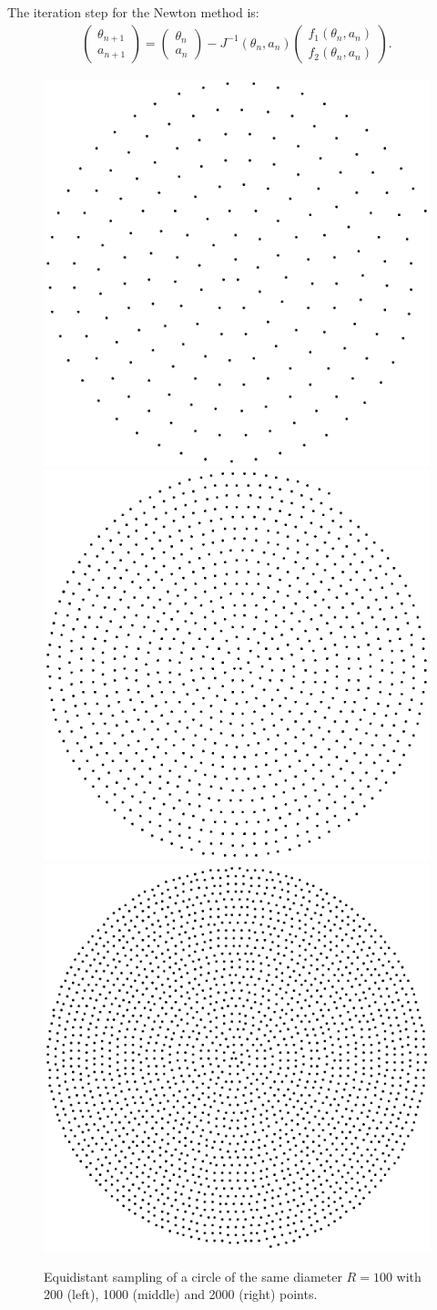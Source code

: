 \documentclass[twocolumn,DIV18]{scrartcl}
\renewcommand{\(}{\left(}
\renewcommand{\)}{\right)}
\begin{document}
The iteration step for the Newton method is:
\begin{align}
  \begin{pmatrix}\theta_{n+1}\\a_{n+1}\end{pmatrix}=
  \begin{pmatrix}\theta_n\\a_n\end{pmatrix}
  -J^{-1}(\theta_n,a_n)
  \begin{pmatrix}f_1(\theta_n,a_n)\\f_2(\theta_n,a_n)\end{pmatrix}.
\end{align}
\begin{figure}[h]
  \begin{center}
    \includegraphics[width=.3\columnwidth]{200}
    \includegraphics[width=.3\columnwidth]{1000}
    \includegraphics[width=.3\columnwidth]{2000}
  \end{center}
  \caption{Equidistant sampling of a circle of the same diameter
    $R=100$ with 200 (left), 1000 (middle) and 2000 (right)
    points.}
\end{figure}
\end{document}
